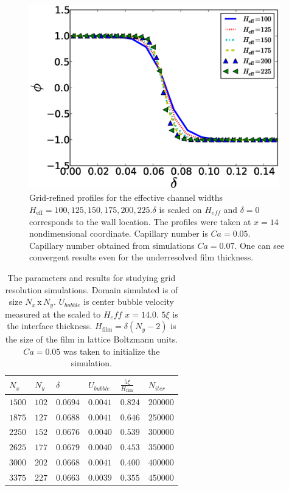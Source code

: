 \documentclass{article}
\begin{document}
\begin{figure}
\includegraphics[width=0.97\textwidth]{Figures/Grid/norm_grid_profs.eps}
\caption{Grid-refined profiles for the effective
channel widths
$H_{\mathrm{eff}}=100,125,150,175,200,225$.$\delta$ is scaled on $H_{eff}$ and $\delta=0$
corresponds to the wall location. The profiles were taken at $x=14$ nondimensional coordinate.
Capillary number is $Ca=0.05$. Capillary number obtained from simulations $Ca=0.07$. One can
see
convergent results even for the underresolved film
thickness.\label{fig:grid:profiles}}
\end{figure}
\begin{table}
\begin{tabularx}{0.97\textwidth}{|X|X|X|X|X|X|}
\hline
$N_x$&$N_y$&$\delta$&$U_{bubble}$&$\frac{5\xi}{H_{\mathrm{film}}}$&$N_{iter}$\\
\hline
$1500$&$102$&$0.0694$&$0.0041$&$0.824$&$200000$\\
\hline
$1875$&$127$&$0.0688$&$0.0041$&$0.646$&$250000$\\
\hline
$2250$&$152$&$0.0676$&$0.0040$&$0.539$&$300000$\\
\hline
$2625$&$177$&$0.0679$&$0.0040$&$0.453$&$350000$\\
\hline
$3000$&$202$&$0.0668$&$0.0041$&$0.400$&$400000$\\
\hline
$3375$&$227$&$0.0663$&$0.0039$&$0.355$&$450000$\\
\hline
\end{tabularx}
\caption{The parameters and results for studying grid resolution simulations. Domain simulated is
of size $N_x\, \mathrm{x}\, N_y$. $U_{bubble}$ is center
bubble velocity measured at the scaled to $H_eff$ $x=14.0$.
$5\xi$ is the interface thickness. $H_{\mathrm{film}}=\delta (N_y-2)$ is the size of the film in
lattice Boltzmann units. $Ca=0.05$ was taken to initialize the simulation.
\label{table:parameters:grid:refinement}}
\end{table}
\end{document}

